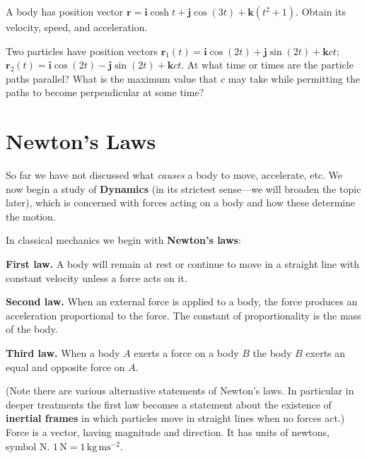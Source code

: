 \vspace{3mm}
\noindent \theexamplecounter
\label{Q:5.1}
A body has position vector 
$\boldsymbol{r}=\boldsymbol{i} \cosh t  + \boldsymbol{j} \cos (3t) + \boldsymbol{k} (t^2 +1)$.
Obtain its velocity, speed, and acceleration.

\vspace{3mm}
\noindent \theexamplecounter
\label{Q:5.2}
Two particles have position vectors
$\boldsymbol{r}_1 (t) = \boldsymbol{i} \cos (2t) + \boldsymbol{j} \sin (2t) + \boldsymbol{k} ct$;
$\boldsymbol{r}_2 (t) = \boldsymbol{i} \cos (2t) - \boldsymbol{j} \sin (2t) + \boldsymbol{k} ct$.
At what time or times are the particle paths parallel?
What is the maximum value that $c$ may take while permitting the paths to become
perpendicular at some time?


\vspace{10mm}
\section{Newton's Laws}

So far we have not discussed what {\it causes} a body to move, accelerate, etc.
We now begin a study of {\bf Dynamics} (in its strictest sense---we will broaden
the topic later), which is concerned with forces acting on a body and how these
determine the motion.

In classical mechanics we begin with {\bf Newton's laws}:

\vspace{3mm}
\begin{minipage}{100mm}

\noindent
{\bf First law.} A body will remain at rest or continue to move in a straight line
with constant velocity unless a force acts on it.

\noindent
{\bf Second law.} When an external force is applied to a body, the force produces
an acceleration proportional to the force. The constant of proportionality is the
mass of the body.

\noindent
{\bf Third law.} When a body $A$ exerts a force on a body $B$ the body $B$ exerts an
equal and opposite force on $A$.

\end{minipage}
\vspace{3mm}

\noindent
(Note there are various alternative statements of Newton's laws. In particular in 
deeper treatments the first law becomes a statement about the existence of 
\textbf{inertial frames} in which particles move in straight lines when no forces act.)
Force is a vector, having magnitude and direction. It has units of newtons, symbol
$\mathrm{N}$. $1 \, \mathrm{N} = 1 \, \mathrm{kg}\,\mathrm{ms}^{-2}$.


